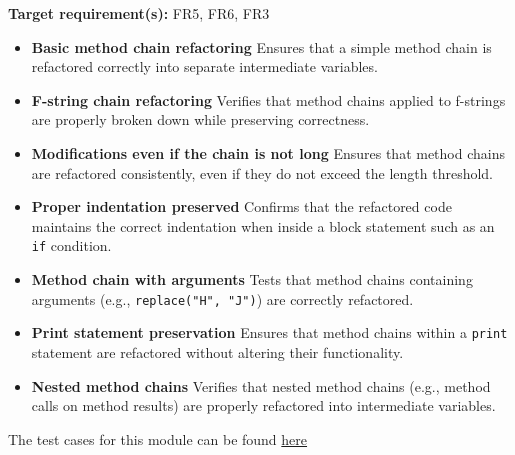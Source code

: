 \documentclass[12pt, titlepage]{article}
\begin{document}
  \noindent \textbf{Target requirement(s):} FR5, FR6, FR3 ~\cite{SRS} \\

  \begin{itemize}
    \item \textbf{Basic method chain refactoring} \newline
      Ensures that a simple method chain is refactored correctly into
      separate intermediate variables.

    \item \textbf{F-string chain refactoring} \newline
      Verifies that method chains applied to f-strings are properly
      broken down while preserving correctness.

    \item \textbf{Modifications even if the chain is not long} \newline
      Ensures that method chains are refactored consistently, even if
      they do not exceed the length threshold.

    \item \textbf{Proper indentation preserved} \newline
      Confirms that the refactored code maintains the correct
      indentation when inside a block statement such as an
      \texttt{if} condition.

    \item \textbf{Method chain with arguments} \newline
      Tests that method chains containing arguments (e.g.,
      \texttt{replace("H", "J")}) are correctly refactored.

    \item \textbf{Print statement preservation} \newline
      Ensures that method chains within a \texttt{print} statement
      are refactored without altering their functionality.

    \item \textbf{Nested method chains} \newline
      Verifies that nested method chains (e.g., method calls on
      method results) are properly refactored into intermediate variables.
  \end{itemize}

  \noindent The test cases for this module can be found
  \href{https://github.com/ssm-lab/capstone--source-code-optimizer/blob/main/tests/refactorers/test_long_element_chain.py}{here}
\end{document}
